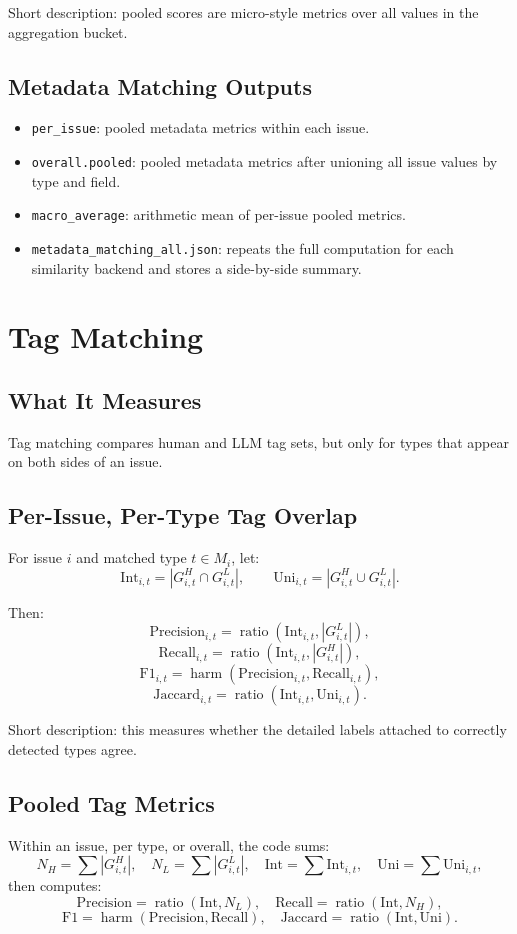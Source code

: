 \documentclass[11pt]{article}
\begin{document}
Short description: pooled scores are micro-style metrics over all values in the aggregation bucket.

\subsection{Metadata Matching Outputs}
\begin{itemize}[leftmargin=*]
\item \texttt{per\_issue}: pooled metadata metrics within each issue.
\item \texttt{overall.pooled}: pooled metadata metrics after unioning all issue values by type and field.
\item \texttt{macro\_average}: arithmetic mean of per-issue pooled metrics.
\item \texttt{metadata\_matching\_all.json}: repeats the full computation for each similarity backend and stores a side-by-side summary.
\end{itemize}

\section{Tag Matching}
\subsection{What It Measures}
Tag matching compares human and LLM tag sets, but only for types that appear on both sides of an issue.

\subsection{Per-Issue, Per-Type Tag Overlap}
For issue $i$ and matched type $t \in M_i$, let:
\[
\mathrm{Int}_{i,t}=|G_{i,t}^{H}\cap G_{i,t}^{L}|,
\qquad
\mathrm{Uni}_{i,t}=|G_{i,t}^{H}\cup G_{i,t}^{L}|.
\]

Then:
\[
\mathrm{Precision}_{i,t}=\operatorname{ratio}(\mathrm{Int}_{i,t},|G_{i,t}^{L}|),
\]
\[
\mathrm{Recall}_{i,t}=\operatorname{ratio}(\mathrm{Int}_{i,t},|G_{i,t}^{H}|),
\]
\[
\mathrm{F1}_{i,t}=\operatorname{harm}(\mathrm{Precision}_{i,t},\mathrm{Recall}_{i,t}),
\]
\[
\mathrm{Jaccard}_{i,t}=\operatorname{ratio}(\mathrm{Int}_{i,t},\mathrm{Uni}_{i,t}).
\]

Short description: this measures whether the detailed labels attached to correctly detected types agree.

\subsection{Pooled Tag Metrics}
Within an issue, per type, or overall, the code sums:
\[
N_H=\sum |G_{i,t}^{H}|,\quad
N_L=\sum |G_{i,t}^{L}|,\quad
\mathrm{Int}=\sum \mathrm{Int}_{i,t},\quad
\mathrm{Uni}=\sum \mathrm{Uni}_{i,t},
\]
then computes:
\[
\mathrm{Precision}=\operatorname{ratio}(\mathrm{Int},N_L),\quad
\mathrm{Recall}=\operatorname{ratio}(\mathrm{Int},N_H),
\]
\[
\mathrm{F1}=\operatorname{harm}(\mathrm{Precision},\mathrm{Recall}),\quad
\mathrm{Jaccard}=\operatorname{ratio}(\mathrm{Int},\mathrm{Uni}).
\]
\end{document}
